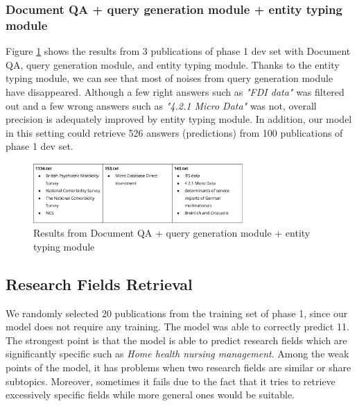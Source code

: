 \documentclass[11pt]{article}
\begin{document}
\subsubsection{Document QA + query generation module + entity typing module}
Figure \ref{fig:docqaqueryentity} shows the results from 3 publications of phase 1 dev set with Document QA, query generation module, and entity typing module. Thanks to the entity typing module, we can see that most of noises from query generation module have disappeared. Although a few right answers such as \textit{"FDI data"} was filtered out and a few wrong answers such as \textit{"4.2.1 Micro Data"} was not, overall precision is adequately improved by entity typing module. In addition, our model in this setting could retrieve 526 answers (predictions) from 100 publications of phase 1 dev set.

\begin{figure}[!htb]
    \centering
    \includegraphics[width = 8cm]{phase1+querygen+entitytyping.png}
    \caption{Results from Document QA + query generation module + entity typing module}
    \label{fig:docqaqueryentity}
\end{figure}

\subsection{Research Fields Retrieval}
We randomly selected  20 publications from the training set of phase 1, since our model does not require any training. The model was able to correctly predict 11. The strongest point is that the model is able to predict research fields which are  significantly specific such as \textit{Home health nursing management}. Among the weak points of the model, it has problems when two research fields are similar or share subtopics. Moreover, sometimes it fails due to the fact that it tries to retrieve excessively specific fields while more general ones would be suitable.
%
\end{document}
